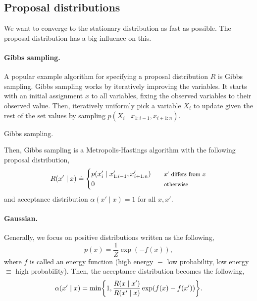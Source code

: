 \subsection{Proposal distributions}

We want to converge to the stationary distribution as fast as possible. The
proposal distribution has a big influence on this.

\paragraph{Gibbs sampling.}

A popular example algorithm for specifying a proposal distribution $R$ is
Gibbs sampling. Gibbs sampling works by iteratively improving the variables.
It starts with an initial assignment $x$ to all variables, fixing the
observed variables to their observed value. Then, iteratively uniformly pick
a variable $X_i$ to update given the rest of the set values by sampling
$p(X_i \mid x_{1:i-1}, x_{i+1:n})$.

\begin{algorithm}
  \caption{Gibbs sampling.}

  \begin{algorithmic}[1]
      \EndFor
    \EndFunction
  \end{algorithmic}
\end{algorithm}

Then, Gibbs sampling is a Metropolis-Hastings algorithm with the following
proposal distribution, \[
  R(x'\mid x) \doteq
  \begin{cases}
    p(x'_i \mid x'_{1:i-1}, x'_{i+1:n}) & \text{\footnotesize $x'$ differs from $x$} \\
    0 & \text{\footnotesize otherwise}
  \end{cases}
\]
and acceptance distribution $\alpha(x'\mid x) = 1$ for all $x,x'$.

\paragraph{Gaussian.}

Generally, we focus on positive distributions written as the following, \[
  p(x) = \frac{1}{Z} \exp (-f(x))
,\]
where $f$ is called an energy function (high energy $\equiv$ low probability,
low energy $\equiv$ high probability). Then, the acceptance distribution
becomes the following, \[
  \alpha(x'\mid x) = \min \lft\{ 1, \frac{R(x\mid x')}{R(x'\mid x)}\exp(f(x) - f(x')) \rgt\}
.\]

